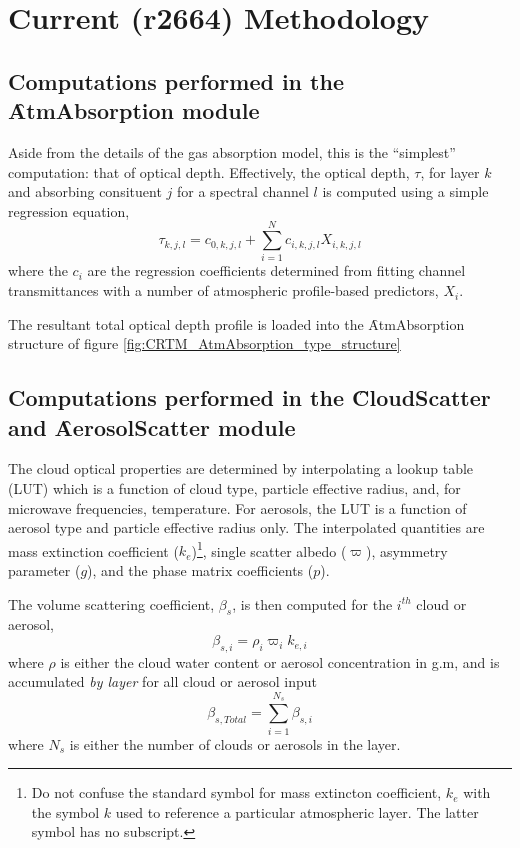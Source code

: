 \section{Current (r2664) Methodology}

\subsection{Computations performed in the \f{AtmAbsorption} module}

Aside from the details of the gas absorption model, this is the ``simplest'' computation: that of optical depth. Effectively, the optical depth, $\tau$, for layer $k$ and absorbing consituent $j$ for a spectral channel $l$ is computed using a simple regression equation,
\begin{equation}
  \tau_{k,j,l} = c_{0,k,j,l} + \sum_{i=1}^{N} c_{i,k,j,l} X_{i,k,j,l}
\end{equation}
where the $c_i$ are the regression coefficients determined from fitting channel transmittances with a number of atmospheric profile-based predictors, $X_i$.

The resultant total optical depth profile is loaded into the \f{AtmAbsorption} structure of figure \ref{fig:CRTM_AtmAbsorption_type_structure}


\subsection{Computations performed in the \f{CloudScatter} and \f{AerosolScatter} module}

The cloud optical properties are determined by interpolating a lookup table (LUT) which is a function of cloud type, particle effective radius, and, for microwave frequencies, temperature. For aerosols, the LUT is a function of aerosol type and particle effective radius only. The interpolated quantities are mass extinction coefficient ($k_e$)\footnote{Do not confuse the standard symbol for mass extincton coefficient, $k_e$ with the symbol $k$ used to reference a particular atmospheric layer. The latter symbol has no subscript.}, single scatter albedo ($\varpi$), asymmetry parameter ($g$), and the phase matrix coefficients ($p$).

The volume scattering coefficient, $\beta_s$, is then computed for the $i^{th}$ cloud or aerosol,
\begin{equation}
  \beta_{s,i} = \rho_{i} \varpi_{i} k_{e,i}
\end{equation}
where $\rho$ is either the cloud water content or aerosol concentration in g.m, and is accumulated \emph{by layer} for all cloud or aerosol input
\begin{equation}
  \beta_{s,Total} = \sum_{i=1}^{N_s}\beta_{s,i}
\end{equation}
where $N_s$ is either the number of clouds or aerosols in the layer.

